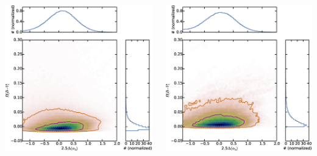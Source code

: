 \documentclass[landscape,9pt]{beamer}
\begin{document}
\begin{frame}[label=L14_fits]
	\begin{columns}
		\begin{column}{0.45\textwidth}
			\includegraphics[width=\textwidth]{../images/Dust/f10c}
		\end{column}
		\begin{column}{0.45\textwidth}
			\includegraphics[width=\textwidth]{../images/Dust/f10d}

\end{column}
\end{columns}
\end{frame}
\end{document}

